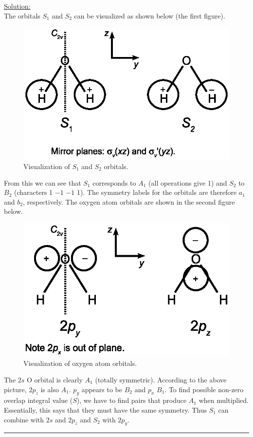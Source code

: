 \noindent
\underline{Solution:}\\

\noindent
The orbitals $S_1$ and $S_2$ can be visualized as shown below (the first figure).
\begin{figure}[h]
\centering
\includegraphics[scale=0.45]{watermo}
\caption{Visualization of $S_1$ and $S_2$ orbitals.}
\end{figure}
From this we can see that $S_1$ corresponds to $A_1$ (all operations give 1) and $S_2$ to $B_2$ (characters 1 $-1$ $-1$ 1).
The symmetry labels for the orbitals are therefore $a_1$ and $b_2$, respectively. The oxygen atom orbitals are shown in the second figure below.
\begin{figure}[h]
\centering
\includegraphics[scale=0.45]{watermo2}
\caption{Visualization of oxygen atom orbitals.}
\end{figure}
The $2s$ O orbital is clearly $A_1$ (totally symmetric). According to the above picture, $2p_z$ is also $A_1$. $p_y$ appears to
be $B_2$ and $p_x$ $B_1$. To find possible non-zero overlap integral value ($S$), we have to find pairs that produce $A_1$ when multiplied. Essentially, this says
that they must have the same symmetry. Thus $S_1$ can combine with $2s$ and $2p_z$ and $S_2$ with $2p_y$.\\

\hrule\vspace{0.5cm}



